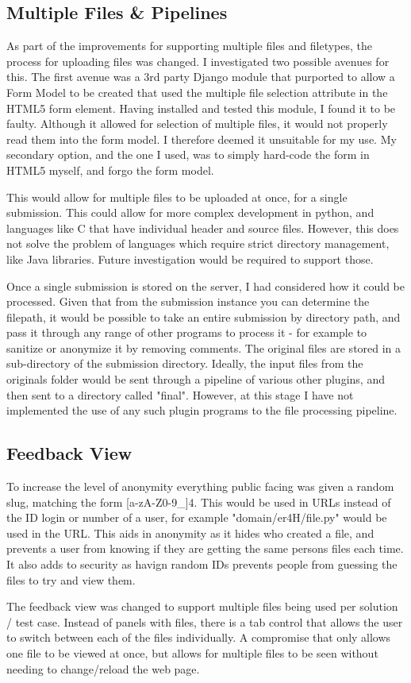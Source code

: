 \documentclass[a4paper,11pt]{report}
\begin{document}
\subsection{Multiple Files \& Pipelines}
As part of the improvements for supporting multiple files and filetypes, the process for uploading  files was changed. I investigated two possible avenues for this. The first avenue was a 3rd party Django module that purported to allow a Form Model to be created that used the multiple file selection attribute in the HTML5 form element. Having installed and tested this module, I found it to be faulty. Although it allowed for selection of multiple files, it would not properly read them into the form model. I therefore deemed it unsuitable for my use. My secondary option, and the one I used, was to simply hard-code the form in HTML5 myself, and forgo the form model.\par
This would allow for multiple files to be uploaded at once, for a single submission. This could allow for more complex development in python, and languages like C that have individual header and source files. However, this does not solve the problem of languages which require strict directory management, like Java libraries. Future investigation would be required to support those.\par
Once a single submission is stored on the server, I had considered how it could be processed. Given that from the submission instance you can determine the filepath, it would be possible to take an entire submission by directory path, and pass it through any range of other programs to process it - for example to sanitize or anonymize it by removing comments. The original files are stored in a sub-directory of the submission directory. Ideally, the input files from the originals folder would be sent through a pipeline of various other plugins, and then sent to a directory called "final". However, at this stage I have not implemented the use of any such plugin programs to the file processing pipeline.\par
\subsection{Feedback View}
To increase the level of anonymity everything public facing was given a random slug, matching the form [a-zA-Z0-9\-\_]{4}. This would be used in URLs instead of the ID login or number of a user, for example "domain/er4H/file.py" would be used in the URL. This aids in anonymity as it hides who created a file, and prevents a user from knowing if they are getting the same persons files each time. It also adds to security as havign random IDs prevents people from guessing the files to try and view them.\par
The feedback view was changed to support multiple files being used per solution / test case. Instead of panels with files, there is a tab control that allows the user to switch between each of the files individually. A compromise that only allows one file to be viewed at once, but allows for multiple files to be seen without needing to change/reload the web page.\par
\end{document}
